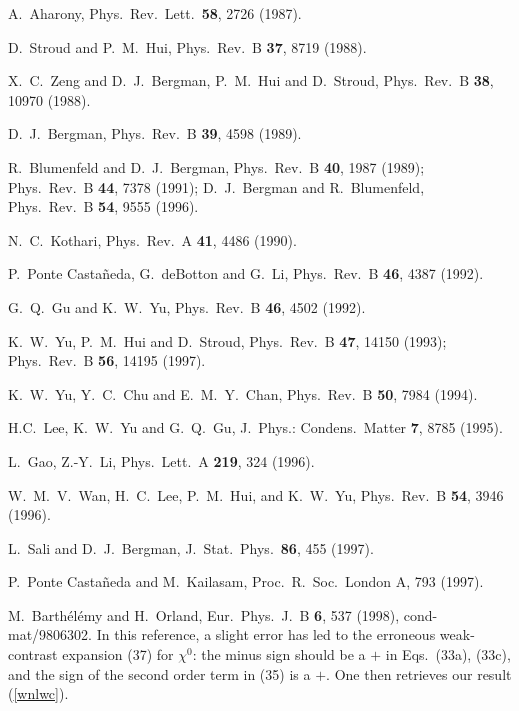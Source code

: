 \begin{thebibliography}{99}
 A.\ Aharony,
Phys.\ Rev.\ Lett.\ {\bf 58}, 2726 (1987).

 D.\ Stroud and P.\ M.\ Hui,
Phys.\ Rev.\ B {\bf 37}, 8719 (1988).

 X.\ C.\ Zeng and D.\ J.\ Bergman,
P.\ M.\ Hui and D.\ Stroud, Phys.\ Rev.\ B {\bf 38}, 10970 (1988).

 D.\ J.\ Bergman, Phys.\ Rev.\ B {\bf 39}, 4598 (1989).

 R.\ Blumenfeld and D.\ J.\ Bergman,
Phys.\ Rev.\ B {\bf 40}, 1987 (1989); Phys.\ Rev.\ B {\bf 44}, 7378 (1991);
D.\ J.\ Bergman and R.\ Blumenfeld, Phys.\ Rev.\ B {\bf 54}, 9555 (1996).

 N.\ C.\ Kothari, Phys.\ Rev.\ A {\bf 41}, 4486 (1990).

 P.\ Ponte Casta\~{n}eda, G.\ deBotton and G.\ Li,
Phys.\ Rev.\ B {\bf 46}, 4387 (1992).

 G.\ Q.\ Gu and K.\ W.\ Yu,
Phys.\ Rev.\  B {\bf 46}, 4502 (1992).

 K.\ W.\ Yu, P.\ M.\ Hui and D.\ Stroud,
Phys.\ Rev.\ B {\bf 47}, 14150 (1993); Phys.\ Rev.\ B {\bf 56}, 14195 (1997).

 K.\ W.\ Yu, Y.\ C.\ Chu and E.\ M.\ Y.\ Chan,
Phys.\ Rev.\ B {\bf 50}, 7984 (1994).

 H.\-C.\ Lee, K.\ W.\ Yu and G.\ Q.\ Gu,
J.\ Phys.: Condens.\ Matter {\bf 7}, 8785 (1995).

 L.\ Gao, Z.-Y.\ Li,
Phys.\ Lett.\ A {\bf 219}, 324 (1996).

 W.\ M.\ V.\ Wan, H.\ C.\ Lee, P.\ M.\ Hui, and K.\ W.\ Yu,
Phys.\ Rev.\ B {\bf 54}, 3946 (1996).

 L.\ Sali and D.\ J.\ Bergman,
J.\ Stat.\ Phys.\ {\bf 86}, 455 (1997).

 P.\ Ponte Casta\~{n}eda and M.\ Kailasam,
Proc.\ R.\ Soc.\ London A, 793 (1997).

 M.\ Barth\'{e}l\'{e}my and H.\ Orland,
Eur.\ Phys.\ J.\ B {\bf 6}, 537 (1998), cond-mat/9806302.
In this reference, a slight error has led to the erroneous
weak-contrast expansion (37) for $\chi^0$: the minus sign
should be a $+$ in Eqs.\ (33a), (33c), and the sign of the
second order term in (35) is a $+$. One then retrieves our
result (\ref{wnlwc}).


\end{thebibliography}
